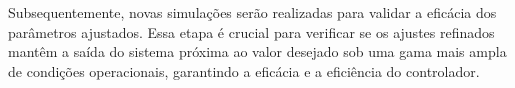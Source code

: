 Subsequentemente, novas simulações serão realizadas para validar a eficácia dos parâmetros ajustados. Essa etapa é crucial para verificar se os ajustes refinados mantêm a saída do sistema próxima ao valor desejado sob uma gama mais ampla de condições operacionais, garantindo a eficácia e a eficiência do controlador.
